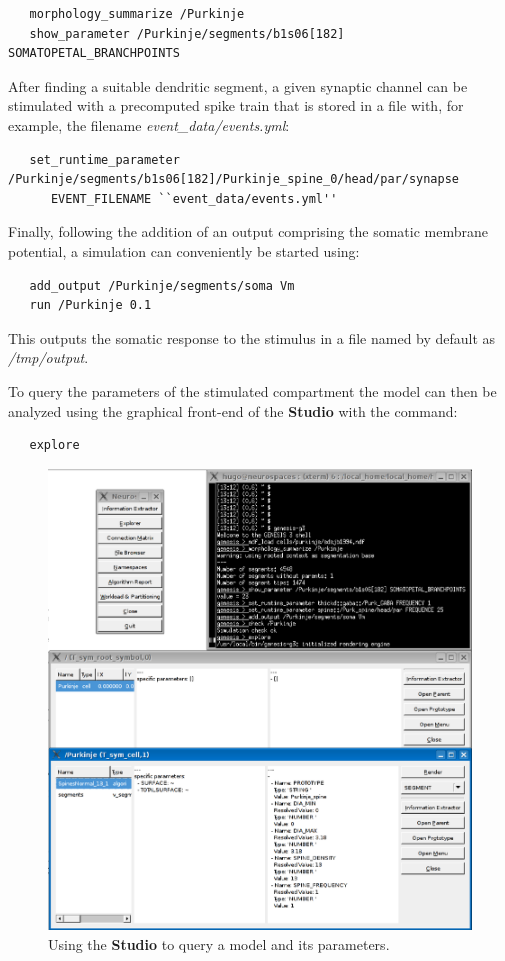 \documentclass[12pt]{article}
\begin{document}
{\footnotesize
\begin{verbatim}
   morphology_summarize /Purkinje
   show_parameter /Purkinje/segments/b1s06[182] SOMATOPETAL_BRANCHPOINTS
\end{verbatim}
}

After finding a suitable dendritic segment, a given synaptic channel can
be stimulated with a precomputed spike train that is stored in a file
with, for example, the filename {\it event\_data/events.yml}:

{\footnotesize
\begin{verbatim}
   set_runtime_parameter /Purkinje/segments/b1s06[182]/Purkinje_spine_0/head/par/synapse
      EVENT_FILENAME ``event_data/events.yml''
\end{verbatim}
}

Finally, following the addition of an output comprising the somatic membrane potential, a simulation can conveniently be started using:

{\footnotesize
\begin{verbatim}
   add_output /Purkinje/segments/soma Vm
   run /Purkinje 0.1
\end{verbatim}
}

This outputs the somatic response to the stimulus in a file named by default as {\it /tmp/output}.

To query the parameters of the stimulated compartment the model can
then be analyzed using the graphical front-end of the {\bf Studio}
with the command:

{\footnotesize
\begin{verbatim}
   explore
\end{verbatim}
}

\begin{figure}[ht]
  \centering
  \includegraphics[scale=0.3]{figures/studio-screenshot.eps}
  \caption{Using the {\bf Studio} to query a model and its
    parameters.}
  \label{fig:cbi-studio}
\end{figure}
\end{document}

